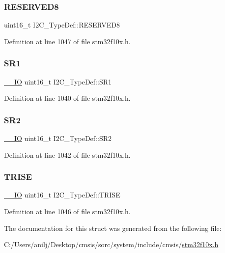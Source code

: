 \subsubsection{\texorpdfstring{R\+E\+S\+E\+R\+V\+E\+D8}{RESERVED8}}
{\footnotesize\ttfamily uint16\+\_\+t I2\+C\+\_\+\+Type\+Def\+::\+R\+E\+S\+E\+R\+V\+E\+D8}



Definition at line 1047 of file stm32f10x.\+h.

\mbox{\label{struct_i2_c___type_def_ae1602cd1c9cad449523099c97138f991}} 
\subsubsection{\texorpdfstring{S\+R1}{SR1}}
{\footnotesize\ttfamily \hyperlink{core__sc300_8h_aec43007d9998a0a0e01faede4133d6be}{\+\_\+\+\_\+\+IO} uint16\+\_\+t I2\+C\+\_\+\+Type\+Def\+::\+S\+R1}



Definition at line 1040 of file stm32f10x.\+h.

\mbox{\label{struct_i2_c___type_def_a95c7f729b10eb2acafe499d9c9a81a83}} 
\subsubsection{\texorpdfstring{S\+R2}{SR2}}
{\footnotesize\ttfamily \hyperlink{core__sc300_8h_aec43007d9998a0a0e01faede4133d6be}{\+\_\+\+\_\+\+IO} uint16\+\_\+t I2\+C\+\_\+\+Type\+Def\+::\+S\+R2}



Definition at line 1042 of file stm32f10x.\+h.

\mbox{\label{struct_i2_c___type_def_aaba7a808e4dfae5cc06b197c298af206}} 
\subsubsection{\texorpdfstring{T\+R\+I\+SE}{TRISE}}
{\footnotesize\ttfamily \hyperlink{core__sc300_8h_aec43007d9998a0a0e01faede4133d6be}{\+\_\+\+\_\+\+IO} uint16\+\_\+t I2\+C\+\_\+\+Type\+Def\+::\+T\+R\+I\+SE}



Definition at line 1046 of file stm32f10x.\+h.



The documentation for this struct was generated from the following file\+:\begin{DoxyCompactItemize}
\item 
C\+:/\+Users/anilj/\+Desktop/cmsis/sorc/system/include/cmsis/\hyperlink{stm32f10x_8h}{stm32f10x.\+h}\end{DoxyCompactItemize}
